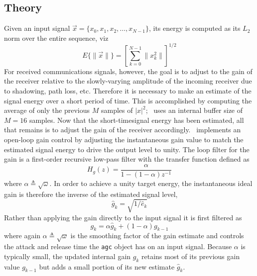\subsection{Theory}
\label{module:agc:theory}
Given an input signal
$\vec{x} = \{ x_0, x_1, x_2, \ldots, x_{N-1} \}$,
its energy is computed as its $L_2$ norm over the entire sequence, viz
\begin{equation}
\label{eqn:agc:energy}
    E\{ \|\vec{x}\| \} = 
        \left[
            \sum\limits_{k=0}^{N-1} {\|x_k^2\|}
        \right]^{1/2}
\end{equation}
For received communications signals, however, the goal is to adjust to the
gain of the receiver relative to the slowly-varying amplitude of the incoming
receiver due to shadowing, path loss, etc.
Therefore it is necessary to make an estimate of the signal energy over
a short period of time.
This is accomplished by computing the average of only the previous $M$
samples of $|x|^2$; \liquid\ uses an internal buffer size of $M=16$
samples.
Now that the short-timesignal energy has been estimated, all that remains is to
adjust the gain of the receiver accordingly.
\liquid\ implements an open-loop gain control by adjusting the
instantaneous gain value to match the estimated signal energy to drive
the output level to unity.
The loop filter for the gain is a first-order recursive low-pass filter
with the transfer function defined as
%
\begin{equation}
\label{eqn:agc:loop_filter}
    H_g(z) =
        \frac{
            \alpha
        }{
            1 - (1-\alpha) z^{-1}
        }
\end{equation}
%
where $\alpha \triangleq \sqrt{\omega}$.
%
In order to achieve a unity target energy, the instantaneous ideal gain is
therefore the inverse of the estimated signal level,
%
\begin{equation}
\label{eqn:agc:default:ghat}
    \hat{g}_{k} = \sqrt{1 / \hat{e}_k}
\end{equation}
%
Rather than applying the gain directly to the input signal it is first
filtered as
%
\begin{equation}
\label{eqn:agc:default:g}
    g_{k} = \alpha \hat{g}_{k} + (1-\alpha) g_{k-1}
\end{equation}
%
where again $\alpha \triangleq \sqrt{\omega}$ is the smoothing factor of
the gain estimate and controls the attack and release time the {\tt agc}
object has on an input signal.
Because $\alpha$ is typically small, the updated internal gain $g_{k}$
retains most of its previous gain value $g_{k-1}$ but adds a small
portion of its new estimate $\hat{g}_{k}$.


